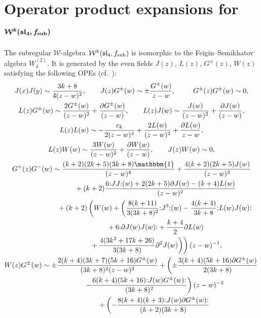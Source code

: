  \section[Operator product expansions for W\^{}k(sl\_4, f\_sub)]{Operator product expansions for $\boldsymbol{\mathcal{W}^{k}(\mathfrak{sl}_4, f_{\rm sub})}$}
 \label{appendix-b}

 The subregular $\mathcal{W}$-algebra $\mathcal{W}^{k}(\mathfrak{sl}_4, f_{\rm sub})$ is isomorphic to the Feigin--Semikhatov algebra $W^{(2)}_4$. It is generated by the even fields $J(z)$, $L(z)$, $G^{\pm}(z)$, $W(z)$ satisfying the following OPEs (cf.~\cite{FS}):
 \begin{gather*}
 J(x)J(y) \sim \frac{3k+8}{4(z-w)^{2}}, \qquad
 J(z)G^{\pm}(w) \sim \pm \frac{G^{\pm}(w)}{z-w} , \enskip \qquad G^{\pm}(z)G^{\pm}(w) \sim0, \\
	L(z)G^{\pm}(w) \sim \frac{2G^{\pm}(w)}{(z-w)^{2}} + \frac{\partial G^{\pm}(w)}{(z-w)}, \qquad
	L(z)J(w) \sim \frac{J(w)}{(z-w)^{2}} + \frac{\partial J(w)}{(z-w)}, \\
	L(z)L(w) \sim - \frac{c_k}{2(z-w)^{4}}+ \frac{2L(w)}{(z-w)^{2}}+ \frac{\partial L(w)}{z-w}, \\
	L(z) W(w) \sim \frac{3 W(w)}{(z-w)^{2}} + \frac{ \partial W(w)}{(z-w)}, \qquad J(z) W(w) \sim 0,
\\
	G^+(z)G^-(w) \sim \frac{(k+2)(2k+5)(3k+8)\mathbbm{1}}{(z-w)^{4}}+ \frac{4(k+2)(2k+5)J(w)}{ (z-w)^{3}} \\
	\phantom{	G^+(z)G^-(w) \sim }{} + (k+2) \frac{6 {:}JJ{:}(w) +2(2k+5)\partial J(w)-(k+4)L(w)}{(z-w)^{2}} \\
		\phantom{	G^+(z)G^-(w) \sim }{} + (k+2)\left( W(w) + \left(\frac{8(k+11)}{3(3k+8)^2}{:}J^3{:}(w)-\frac{4(k+4)}{3k+8}{:}L(w)J(w){:}\right.\right.\\
\left.\left.\phantom{	G^+(z)G^-(w) \sim }{}+ 6{:}\partial J(w)J(w){:}	 + \frac{k+4}{2}\partial L(w)\right.\right. \\
\left.\left.\phantom{	G^+(z)G^-(w) \sim }{}+ \frac{4(3k^2+17k+26)}{3(3k+8)}\partial ^2J(w)\right)\right)(z-w)^{-1},
\\
	 W(z)G^{\pm}(w) \sim \pm\frac{2(k+4)(3k+7)(5k+16)G^{\pm}(w)}{(3k+8)^2(z-w)^{3}}+ \left(\pm\frac{3(k+4)(5k+16)\partial G^{\pm}(w)}{2(3k+8)} \right. \\
\phantom{ W(z)G^{\pm}(w) \sim }{}	 \left. -\frac{6(k+4)(5k+16){:}J(w)G^{\pm}(w){:} }{(3k+8)^2}\right)(z-w)^{-2} \\
\phantom{ W(z)G^{\pm}(w) \sim }{}+\left(-\frac{8(k+4)(k+3){:}J(w)\partial G^{\pm}(w){:}}{(k+2)(3k+8)} \right. \\

\end{gather*}
